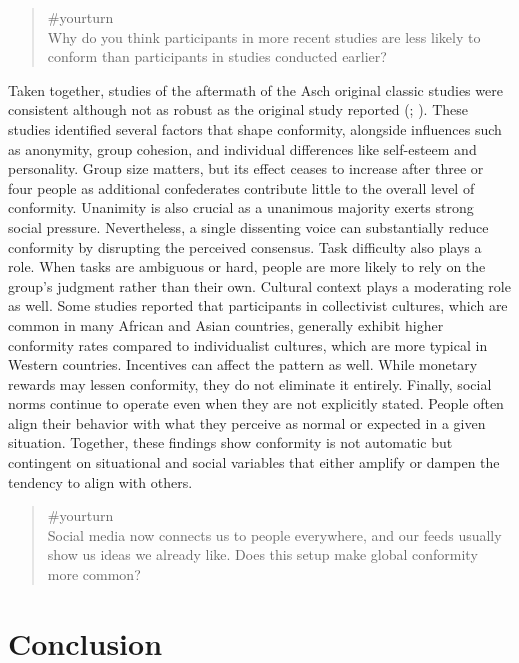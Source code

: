\documentclass[
  letterpaper,
]{book}
\begin{document}
\begin{quote}
{\#yourturn}\\
Why do you think participants in more recent studies are less likely to
conform than participants in studies conducted earlier?
\end{quote}

Taken together, studies of the aftermath of the Asch original classic
studies were consistent although not as robust as the original study
reported (;
). These
studies identified several factors that shape conformity, alongside
influences such as anonymity, group cohesion, and individual differences
like self-esteem and personality. Group size matters, but its effect
ceases to increase after three or four people as additional confederates
contribute little to the overall level of conformity. Unanimity is also
crucial as a unanimous majority exerts strong social pressure.
Nevertheless, a single dissenting voice can substantially reduce
conformity by disrupting the perceived consensus. Task difficulty also
plays a role. When tasks are ambiguous or hard, people are more likely
to rely on the group's judgment rather than their own. Cultural context
plays a moderating role as well. Some studies reported that participants
in collectivist cultures, which are common in many African and Asian
countries, generally exhibit higher conformity rates compared to
individualist cultures, which are more typical in Western countries.
Incentives can affect the pattern as well. While monetary rewards may
lessen conformity, they do not eliminate it entirely. Finally, social
norms continue to operate even when they are not explicitly stated.
People often align their behavior with what they perceive as normal or
expected in a given situation. Together, these findings show conformity
is not automatic but contingent on situational and social variables that
either amplify or dampen the tendency to align with others.

\begin{quote}
{\#yourturn}\\
Social media now connects us to people everywhere, and our feeds usually
show us ideas we already like. Does this setup make global conformity
more common?
\end{quote}

\section{Conclusion}\label{conclusion-6}
\end{document}

